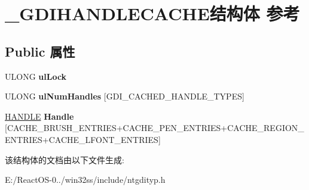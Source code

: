 \hypertarget{struct___g_d_i_h_a_n_d_l_e_c_a_c_h_e}{}\section{\+\_\+\+G\+D\+I\+H\+A\+N\+D\+L\+E\+C\+A\+C\+H\+E结构体 参考}
\label{struct___g_d_i_h_a_n_d_l_e_c_a_c_h_e}
\subsection*{Public 属性}
\begin{DoxyCompactItemize}
\item 
\mbox{\label{struct___g_d_i_h_a_n_d_l_e_c_a_c_h_e_abcca23cbe33fc8237bb76d6e849fb229}} 
U\+L\+O\+NG {\bfseries ul\+Lock}
\item 
\mbox{\label{struct___g_d_i_h_a_n_d_l_e_c_a_c_h_e_a88ebc7372a57588c0bbeebb069bfd956}} 
U\+L\+O\+NG {\bfseries ul\+Num\+Handles} \mbox{[}G\+D\+I\+\_\+\+C\+A\+C\+H\+E\+D\+\_\+\+H\+A\+N\+D\+L\+E\+\_\+\+T\+Y\+P\+ES\mbox{]}
\item 
\mbox{\label{struct___g_d_i_h_a_n_d_l_e_c_a_c_h_e_a73d9846428fc7da2b667766106cc5654}} 
\hyperlink{interfacevoid}{H\+A\+N\+D\+LE} {\bfseries Handle} \mbox{[}C\+A\+C\+H\+E\+\_\+\+B\+R\+U\+S\+H\+\_\+\+E\+N\+T\+R\+I\+ES+C\+A\+C\+H\+E\+\_\+\+P\+E\+N\+\_\+\+E\+N\+T\+R\+I\+ES+C\+A\+C\+H\+E\+\_\+\+R\+E\+G\+I\+O\+N\+\_\+\+E\+N\+T\+R\+I\+ES+C\+A\+C\+H\+E\+\_\+\+L\+F\+O\+N\+T\+\_\+\+E\+N\+T\+R\+I\+ES\mbox{]}
\end{DoxyCompactItemize}


该结构体的文档由以下文件生成\+:\begin{DoxyCompactItemize}
\item 
E\+:/\+React\+O\+S-\/0../win32ss/include/ntgdityp.\+h\end{DoxyCompactItemize}
